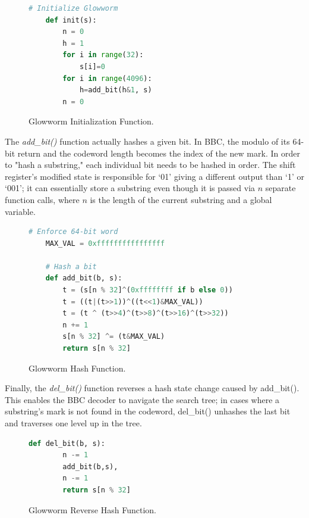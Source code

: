 \documentclass[conference]{IEEEtran}
\begin{document}
\begin{figure}[h]
    \centering
    \begin{lstlisting}[language=Python]
    # Initialize Glowworm
    def init(s):
        n = 0
        h = 1
        for i in range(32):
            s[i]=0
        for i in range(4096):
            h=add_bit(h&1, s)
        n = 0
    \end{lstlisting}
    \caption{Glowworm Initialization Function. }
    \label{gwHashInit}
 \end{figure}

The \textit{add\_bit()} function actually hashes a given bit. In BBC, the modulo of its 64-bit return and the codeword length becomes the index of the new mark. In order to "hash a substring," each individual bit needs to be hashed in order. The shift register's modified state is responsible for ‘01’ giving a different output than ‘1’ or ‘001’; it can essentially store a substring even though it is passed via $n$ separate function calls, where $n$ is the length of the current substring and a global variable.  

\begin{figure}[h]
    \centering
    \begin{lstlisting}[language=Python]
    # Enforce 64-bit word
    MAX_VAL = 0xffffffffffffffff
    
    # Hash a bit
    def add_bit(b, s):
        t = (s[n % 32]^(0xffffffff if b else 0))
        t = ((t|(t>>1))^((t<<1)&MAX_VAL))
        t = (t ^ (t>>4)^(t>>8)^(t>>16)^(t>>32))
        n += 1                           
        s[n % 32] ^= (t&MAX_VAL)
        return s[n % 32] 
    \end{lstlisting}
    \caption{Glowworm Hash Function. }
    \label{gwHashAdd}
 \end{figure}

 Finally, the \textit{del\_bit()} function reverses a hash state change caused by add\_bit(). This enables the BBC decoder to navigate the search tree; in cases where a substring’s mark is not found in the codeword, del\_bit() unhashes the last bit and traverses one level up in the tree.

 \begin{figure}[h]
    \centering
    \begin{lstlisting}[language=Python]
    def del_bit(b, s):
        n -= 1
        add_bit(b,s), 
        n -= 1
        return s[n % 32]
    \end{lstlisting}  
    \caption{Glowworm Reverse Hash Function. }  
    \label{gwHashDel}
 \end{figure}  
\end{document}
